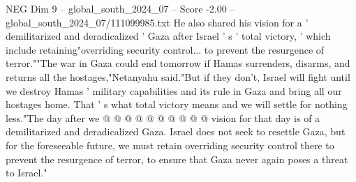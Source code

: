 \begin{textsample}{NEG Dim 9 – global\_south\_2024\_07 – Score -2.00 – global\_south\_2024\_07/111099985.txt}
He also shared his vision for a ' demilitarized and deradicalized ' Gaza after Israel ' s ' total victory, ' which include retaining"overriding security control... to prevent the resurgence of terror.""The war in Gaza could end tomorrow if Hamas surrenders, disarms, and returns all the hostages,"Netanyahu said."But if they don't, Israel will fight until we destroy Hamas ' military capabilities and its rule in Gaza and bring all our hostages home.
That ' s what total victory means and we will settle for nothing less."The day after we @ @ @ @ @ @ @ @ @ @ vision for that day is of a demilitarized and deradicalized Gaza.
Israel does not seek to resettle Gaza, but for the foreseeable future, we must retain overriding security control there to prevent the resurgence of terror, to ensure that Gaza never again poses a threat to Israel."

\end{textsample}
